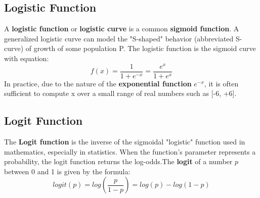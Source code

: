 \documentclass{article} %
\begin{document}
\subsection{Logistic Function}
A \textbf{logistic function} or \textbf{logistic curve} is a common \textbf{sigmoid function}. A generalized logistic curve can model the "S-shaped" behavior  (abbreviated S-curve) of growth of some population P. The logistic function is the sigmoid curve with equation:
\begin{equation}
f\left ( x \right ) = \frac{1}{1+e^{-x}} = \frac{e^x}{1+e^x}
\end{equation}
In practice, due to the nature of the \textbf{exponential function} $e^{-x}$, it is often sufficient to compute x over a small range of real numbers such as [-6, +6].  
\subsection{Logit Function}
The \textbf{Logit function} is the inverse of the sigmoidal "logistic" function used in mathematics, especially in statistics. When the function's parameter represents a probability, the logit function returns the log-odds.The \textbf{logit} of a number $p$ between 0 and 1 is given by the formula:
\begin{equation}
logit\left ( p \right ) = log\left ( \frac{p}{1-p} \right ) = log\left ( p \right ) - log\left ( 1-p \right )  
\end{equation}
\end{document}
